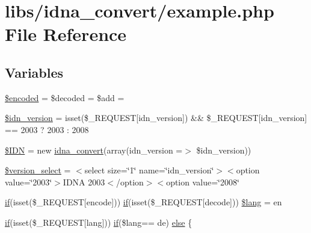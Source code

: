 \hypertarget{example_8php}{}\section{libs/idna\+\_\+convert/example.php File Reference}
\label{example_8php}
\subsection*{Variables}
\begin{DoxyCompactItemize}
\item 
\hyperlink{example_8php_af709b460501204e2ec7e34e96e7de576}{\$encoded} = \$decoded = \$add = \textquotesingle{}\textquotesingle{}
\item 
\hyperlink{example_8php_aaa64132973e10962c52265cfbee1cb9c}{\$idn\+\_\+version} = isset(\$\+\_\+\+R\+E\+Q\+U\+E\+S\+T\mbox{[}\textquotesingle{}idn\+\_\+version\textquotesingle{}\mbox{]}) \&\& \$\+\_\+\+R\+E\+Q\+U\+E\+S\+T\mbox{[}\textquotesingle{}idn\+\_\+version\textquotesingle{}\mbox{]} == 2003 ? 2003 \+: 2008
\item 
\hyperlink{example_8php_aa45ac61e5ada434ea385befcd1aea16d}{\$\+I\+D\+N} = new \hyperlink{classidna__convert}{idna\+\_\+convert}(array(\textquotesingle{}idn\+\_\+version\textquotesingle{} =$>$ \$idn\+\_\+version))
\item 
\hyperlink{example_8php_a13d9753a348e3a016c3d8fb1ac173bbd}{\$version\+\_\+select} = \textquotesingle{}$<$select size=\char`\"{}1\char`\"{} name=\char`\"{}idn\+\_\+version\char`\"{}$>$$<$option value=\char`\"{}2003\char`\"{}$>$I\+D\+N\+A 2003$<$/option$>$$<$option value=\char`\"{}2008\char`\"{}\textquotesingle{}
\item 
\hyperlink{config_8inc_8php_ac202e21c80d0f28d495d074d3c23e1ca}{if}(isset(\$\+\_\+\+R\+E\+Q\+U\+E\+S\+T\mbox{[}\textquotesingle{}encode\textquotesingle{}\mbox{]})) \hyperlink{config_8inc_8php_ac202e21c80d0f28d495d074d3c23e1ca}{if}(isset(\$\+\_\+\+R\+E\+Q\+U\+E\+S\+T\mbox{[}\textquotesingle{}decode\textquotesingle{}\mbox{]})) \hyperlink{example_8php_aef99014231eb219a8c774eb4b8463fd9}{\$lang} = \textquotesingle{}en\textquotesingle{}
\item 
\hyperlink{config_8inc_8php_ac202e21c80d0f28d495d074d3c23e1ca}{if}(isset(\$\+\_\+\+R\+E\+Q\+U\+E\+S\+T\mbox{[}\textquotesingle{}lang\textquotesingle{}\mbox{]})) \hyperlink{config_8inc_8php_ac202e21c80d0f28d495d074d3c23e1ca}{if}(\$lang== \textquotesingle{}de\textquotesingle{}) \hyperlink{example_8php_a62bf8b36de1aa08b54e9822dc49899aa}{else} \{
\end{DoxyCompactItemize}


